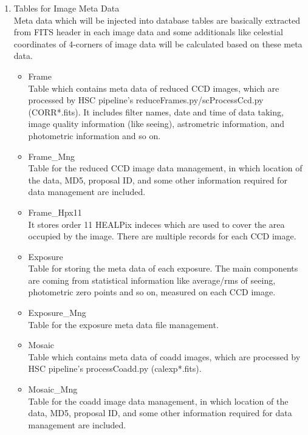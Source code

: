 \documentclass[12pt]{article}
\begin{document}
\begin{enumerate}
\item Tables for Image Meta Data\\
Meta data which will be injected into database tables are basically extracted from FITS header 
in each image data and some additionals like celestial coordinates of 4-corners of image data 
will be calculated based on these meta data.  

\begin{itemize}
\item Frame\\
Table which contains meta data of reduced CCD images, which are processed by HSC pipeline's 
reduceFrames.py/scProcessCcd.py (CORR*.fits). It includes filter names, date and time of 
data taking, image quality information (like seeing), astrometric information, and photometric 
information and so on. 

\item Frame\_Mng\\
Table for the reduced CCD image data management, in which location of the data, MD5, proposal ID, 
and some other information required for data management are included. 

\item Frame\_Hpx11\\
It stores order 11 HEALPix indeces which are used to cover the area occupied by the image. There are 
multiple records for each CCD image.  

\item Exposure\\
Table for storing the meta data of each exposure. The main components are coming from statistical 
information like average/rms of seeing, photometric zero points and so on, measured on each CCD image.  

\item Exposure\_Mng\\
Table for the exposure meta data file management. 

\item Mosaic\\
Table which contains meta data of coadd images, which are processed by HSC pipeline's 
processCoadd.py (calexp*.fits). 

\item Mosaic\_Mng\\
Table for the coadd image data management, in which location of the data, MD5, proposal ID, 
and some other information required for data management are included. 


\end{itemize}
\end{enumerate}
\end{document}

